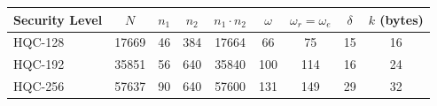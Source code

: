\begin{tabular}{l S[table-format=5.0] S[table-format=3.0] S[table-format=3.0]
                S[table-format=5.0] S[table-format=3.0] S[table-format=3.0]
                S[table-format=3.0] S[table-format=2.0]}
\toprule
{Security Level} & {$N$} & {$n_1$} & {$n_2$} & {$n_1 \cdot n_2$} & {$\omega$} & {$\omega_r = \omega_e$} & {$\delta$} & {$k$ (bytes)} \\
\midrule
HQC-128 & 17669 & 46  & 384 & 17664 & 66  & 75  & 15 & 16 \\
HQC-192 & 35851 & 56  & 640 & 35840 & 100 & 114 & 16 & 24 \\
HQC-256 & 57637 & 90  & 640 & 57600 & 131 & 149 & 29 & 32 \\
\bottomrule
\end{tabular}
